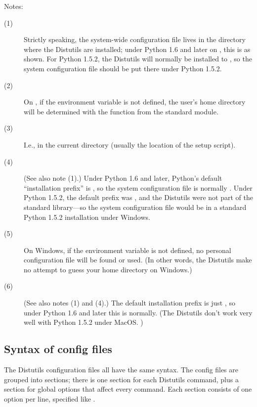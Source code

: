 \documentclass{howto}
\begin{document}
\noindent Notes:
\begin{description}
\item[(1)] Strictly speaking, the system-wide configuration file lives
  in the directory where the Distutils are installed; under Python 1.6
  and later on \UNIX, this is as shown. For Python 1.5.2, the Distutils
  will normally be installed to
  ,
  so the system configuration file should be put there under Python
  1.5.2.
\item[(2)] On \UNIX, if the  environment variable is not
  defined, the user's home directory will be determined with the
   function from the standard  module.
\item[(3)] I.e., in the current directory (usually the location of the
  setup script).
\item[(4)] (See also note (1).)  Under Python 1.6 and later, Python's
  default ``installation prefix'' is , so
  the system configuration file is normally
  .
  Under Python 1.5.2, the default prefix was
  , and the
  Distutils were not part of the standard library---so the system
  configuration file would be
  in a standard Python 1.5.2 installation under Windows.
\item[(5)] On Windows, if the  environment variable is not
  defined, no personal configuration file will be found or used.  (In
  other words, the Distutils make no attempt to guess your home
  directory on Windows.)
\item[(6)] (See also notes (1) and (4).)  The default installation
  prefix is just , so under Python 1.6 and later this is
  normally.  (The Distutils
  don't work very well with Python 1.5.2 under MacOS.  )
\end{description}


\subsection{Syntax of config files}
\label{sec:config-syntax}

The Distutils configuration files all have the same syntax.  The config
files are grouped into sections; there is one section for each Distutils
command, plus a  section for global options that affect
every command.  Each section consists of one option per line, specified
like .
\end{document}
